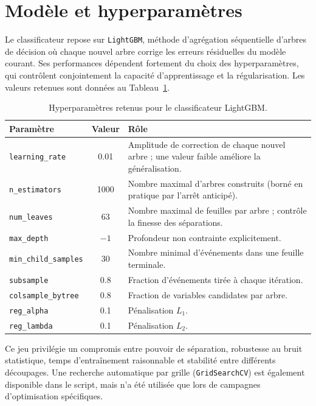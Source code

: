 \section{Modèle et hyperparamètres}
\label{app:pid_hyperparams}

Le classificateur repose sur \texttt{LightGBM}, méthode d'agrégation séquentielle d'arbres de décision où chaque nouvel arbre corrige les erreurs résiduelles du modèle courant. Ses performances dépendent fortement du choix des hyperparamètres, qui contrôlent conjointement la capacité d'apprentissage et la régularisation. Les valeurs retenues sont données au Tableau~\ref{tab:pid-hyperparams}.

\begin{table}[!ht]
    \centering
    \caption{Hyperparamètres retenus pour le classificateur LightGBM.}
    \label{tab:pid-hyperparams}
    \small
    \begin{tabularx}{\textwidth}{@{}l c X@{}}
        \toprule
        \textbf{Paramètre} & \textbf{Valeur} & \textbf{Rôle} \\
        \midrule
        \texttt{learning\_rate} & 0.01 & Amplitude de correction de chaque nouvel arbre ; une valeur faible améliore la généralisation. \\
        \texttt{n\_estimators} & 1000 & Nombre maximal d'arbres construits (borné en pratique par l'arrêt anticipé). \\
        \texttt{num\_leaves} & 63 & Nombre maximal de feuilles par arbre ; contrôle la finesse des séparations. \\
        \texttt{max\_depth} & $-1$ & Profondeur non contrainte explicitement. \\
        \texttt{min\_child\_samples} & 30 & Nombre minimal d'événements dans une feuille terminale. \\
        \texttt{subsample} & 0.8 & Fraction d'événements tirée à chaque itération. \\
        \texttt{colsample\_bytree} & 0.8 & Fraction de variables candidates par arbre. \\
        \texttt{reg\_alpha} & 0.1 & Pénalisation $L_1$. \\
        \texttt{reg\_lambda} & 0.1 & Pénalisation $L_2$. \\
        \bottomrule
    \end{tabularx}
\end{table}

Ce jeu privilégie un compromis entre pouvoir de séparation, robustesse au bruit statistique, temps d'entraînement raisonnable et stabilité entre différents découpages. Une recherche automatique par grille (\texttt{GridSearchCV}) est également disponible dans le script, mais n'a été utilisée que lors de campagnes d'optimisation spécifiques.

